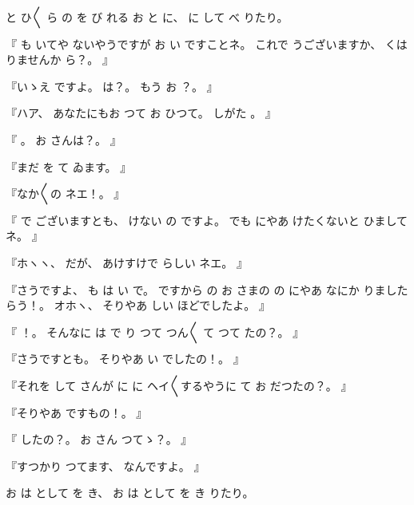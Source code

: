 %
と
ひ〳〵
ら
の
を
び
れる
お
と
に、
%
に
して
べ
りたり。

%
『
も
いてや
ないやうですが
お
い
ですことネ。
%
これで
うございますか、
%
くは
りませんか
ら？。
』

%
『いゝえ
ですよ。
%
は？。
%
もう
お
？。
』

%
『ハア、
%
あなたにもお
つて
お
ひつて。
%
しがた
。
』

%
『
。
%
お
さんは？。
』

%
『まだ
を
て
ゐます。
』

%
『なか〳〵の
ネエ！。
』

%
『
で
ございますとも、
%
けない
の
ですよ。
%
でも
にやあ
けたくないと
ひましてネ。
』

%
『ホヽヽ、
%
だが、
%
あけすけで
らしい
ネエ。
』

%
『さうですよ、
%
も
は
い
で。
%
ですから
の
お
さまの
の
にやあ
なにか
りましたらう！。
%
オホヽ、
%
そりやあ
しい
ほどでしたよ。
』

%
『
！。
%
そんなに
は
で
り
つて
つん〳〵
て
つて
たの？。
』

%
『さうですとも。
%
そりやあ
い
でしたの！。
』

%
『それを
して
さんが
に
に
ヘイ〳〵するやうに
て
お
だつたの？。
』

%
『そりやあ
ですもの！。
』

%
『
したの？。
%
お
さん
つてゝ？。
』

%
『すつかり
つてます、
%
なんですよ。
』

%
お
は
として
を
き、
%
お
は
として
を
き
りたり。
